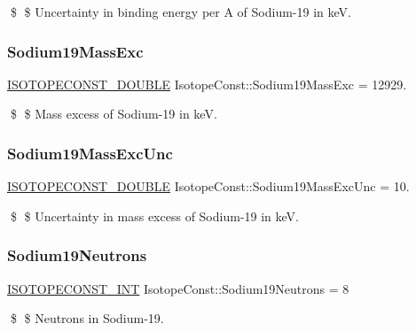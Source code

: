 \$ \$ Uncertainty in binding energy per A of Sodium-\/19 in keV. \mbox{\label{group___isotope_const-_sodium-_na19_gaf4561c84c3663803648011058dad8ca9}} 
\subsubsection{\texorpdfstring{Sodium19\+Mass\+Exc}{Sodium19MassExc}}
{\footnotesize\ttfamily \mbox{\hyperlink{group___isotope_const-_macros_ga8f45a7272ce02c0b4c65c44636ed719a}{I\+S\+O\+T\+O\+P\+E\+C\+O\+N\+S\+T\+\_\+\+D\+O\+U\+B\+LE}} Isotope\+Const\+::\+Sodium19\+Mass\+Exc = 12929.}

\$ \$ Mass excess of Sodium-\/19 in keV. \mbox{\label{group___isotope_const-_sodium-_na19_gab631ade0eb3263ca3cd06dbfff470be6}} 
\subsubsection{\texorpdfstring{Sodium19\+Mass\+Exc\+Unc}{Sodium19MassExcUnc}}
{\footnotesize\ttfamily \mbox{\hyperlink{group___isotope_const-_macros_ga8f45a7272ce02c0b4c65c44636ed719a}{I\+S\+O\+T\+O\+P\+E\+C\+O\+N\+S\+T\+\_\+\+D\+O\+U\+B\+LE}} Isotope\+Const\+::\+Sodium19\+Mass\+Exc\+Unc = 10.}

\$ \$ Uncertainty in mass excess of Sodium-\/19 in keV. \mbox{\label{group___isotope_const-_sodium-_na19_gaf2b41f0dfea04d6636db5f066b2724ca}} 
\subsubsection{\texorpdfstring{Sodium19\+Neutrons}{Sodium19Neutrons}}
{\footnotesize\ttfamily \mbox{\hyperlink{group___isotope_const-_macros_ga5f18360b3e99483a35c32d789e62621c}{I\+S\+O\+T\+O\+P\+E\+C\+O\+N\+S\+T\+\_\+\+I\+NT}} Isotope\+Const\+::\+Sodium19\+Neutrons = 8}

\$ \$ Neutrons in Sodium-\/19. \mbox{\label{group___isotope_const-_sodium-_na19_ga95b3aa0fad0dc86bc826227b3635521a}} 
